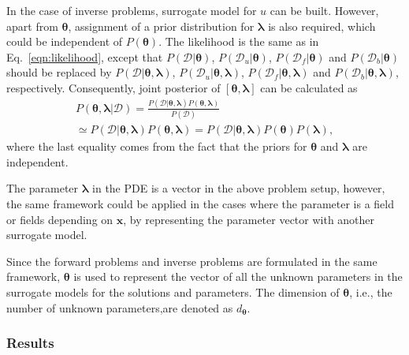 \documentclass[conference,compsoc]{IEEEtran}
\begin{document}
In the case of inverse problems, surrogate model for $u$ can be built\cite{lou2020physics}\cite{yang2021b}. However, apart from $\boldsymbol{\theta}$, assignment of a prior distribution for $\boldsymbol{\lambda}$ is also required, which could be independent of $P(\boldsymbol{\theta})$. The likelihood is the same as in Eq.~\ref{eqn:likelihood}, except that $P(\mathcal{D}|\boldsymbol{\theta})$, $P(\mathcal{D}_u|\boldsymbol{\theta})$, $P(\mathcal{D}_f|\boldsymbol{\theta})$ and $P(\mathcal{D}_b|\boldsymbol{\theta})$ should be replaced by 
$P(\mathcal{D}|\boldsymbol{\theta},\boldsymbol{\lambda})$, $P(\mathcal{D}_u|\boldsymbol{\theta},\boldsymbol{\lambda})$, $P(\mathcal{D}_f|\boldsymbol{\theta},\boldsymbol{\lambda})$ and $P(\mathcal{D}_b|\boldsymbol{\theta},\boldsymbol{\lambda})$, respectively.  Consequently, joint posterior of $[\boldsymbol{\theta}, \boldsymbol{\lambda}]$ can be calculated as
\begin{equation}
\label{eqn:backwardpost}
\begin{aligned}
P(\boldsymbol{\theta}, \boldsymbol{\lambda} | \mathcal{D}) = \frac{ P(\mathcal{D}|\boldsymbol{\theta},\boldsymbol{\lambda})P(\boldsymbol{\theta},\boldsymbol{\lambda})}{P(\mathcal{D})} \\ \simeq P(\mathcal{D}|\boldsymbol{\theta},\boldsymbol{\lambda})P(\boldsymbol{\theta},\boldsymbol{\lambda}) = P(\mathcal{D}|\boldsymbol{\theta},\boldsymbol{\lambda})P(\boldsymbol{\theta})P(\boldsymbol{\lambda}),
\end{aligned}
\end{equation}
where the last equality comes from the fact that the priors for $\boldsymbol{\theta}$ and $\boldsymbol{\lambda}$ are independent.

The parameter $\boldsymbol{\lambda}$ in the PDE is a vector in the above problem setup, however, the same framework could be applied in the cases where the parameter is a field or fields depending on $\boldsymbol{x}$, by representing the parameter vector with another surrogate model\cite{yang2021b}.

Since the forward problems and inverse problems are formulated in the same framework, $\boldsymbol{\theta}$ is used to represent the vector of all the unknown parameters in the surrogate models for the solutions and parameters\cite{lou2020physics}\cite{yang2021b}. The dimension of $\boldsymbol{\theta}$, i.e., the number of unknown parameters,are denoted as $d_{\boldsymbol{\theta}}$. 



\subsubsection{Results}
\end{document}

